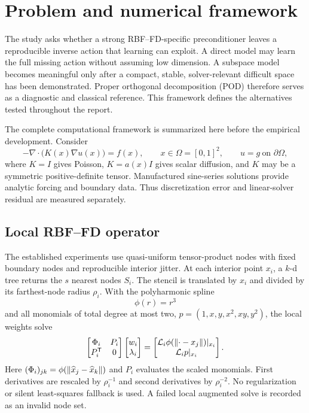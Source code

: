 \section{Problem and numerical framework}

The study asks whether a strong RBF--FD-specific preconditioner leaves a reproducible inverse action that learning can exploit. A direct model may learn the full missing action without assuming low dimension. A subspace model becomes meaningful only after a compact, stable, solver-relevant difficult space has been demonstrated. Proper orthogonal decomposition (POD) therefore serves as a diagnostic and classical reference. This framework defines the alternatives tested throughout the report.

The complete computational framework is summarized here before the empirical development.  Consider
\begin{equation}
 -\nabla\!\cdot\!\bigl(K(x)\nabla u(x)\bigr)=f(x),\qquad x\in\Omega=[0,1]^2,
 \qquad u=g\ \text{on }\partial\Omega ,
 \label{eq:pde}
\end{equation}
where $K=I$ gives Poisson, $K=a(x)I$ gives scalar diffusion, and $K$ may be a symmetric positive-definite tensor.  Manufactured sine-series solutions provide analytic forcing and boundary data.  Thus discretization error and linear-solver residual are measured separately.

\subsection{Local RBF--FD operator}

The established experiments use quasi-uniform tensor-product nodes with fixed boundary nodes and reproducible interior jitter.  At each interior point $x_i$, a $k$-d tree returns the $s$ nearest nodes $S_i$.  The stencil is translated by $x_i$ and divided by its farthest-node radius $\rho_i$.  With the polyharmonic spline
\begin{equation}
 \phi(r)=r^3
 \label{eq:phs}
\end{equation}
and all monomials of total degree at most two,
$p=(1,x,y,x^2,xy,y^2)$, the local weights solve
\begin{equation}
 \begin{bmatrix}\Phi_i&P_i\\P_i^{\mathsf T}&0\end{bmatrix}
 \begin{bmatrix}w_i\\\lambda_i\end{bmatrix}
 =
 \begin{bmatrix}\mathcal L_i\phi(\left\lVert \cdot-x_j\right\rVert)|_{x_i}\\
                 \mathcal L_i p|_{x_i}\end{bmatrix}.
 \label{eq:weights}
\end{equation}
Here $(\Phi_i)_{jk}=\phi(\left\lVert \widehat x_j-\widehat x_k\right\rVert)$ and $P_i$ evaluates the scaled monomials.  First derivatives are rescaled by $\rho_i^{-1}$ and second derivatives by $\rho_i^{-2}$.  No regularization or silent least-squares fallback is used.  A failed local augmented solve is recorded as an invalid node set.

